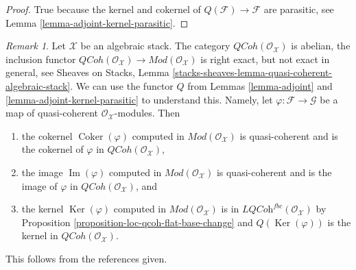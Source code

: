 \documentclass{stacks-project}
\theoremstyle{plain}
\theoremstyle{definition}
\theoremstyle{remark}
\newtheorem{remark}[subsection]{Remark}
\numberwithin{equation}{subsection}
\def\QCoh{\mathit{QCoh}}
\def\Ker{\mathop{\mathrm{Ker}}}
\def\Im{\mathop{\mathrm{Im}}}
\def\Coker{\mathop{\mathrm{Coker}}}
\begin{document}
\begin{proof}
True because the kernel and cokernel of $Q(\mathcal{F}) \to \mathcal{F}$
are parasitic, see Lemma \ref{lemma-adjoint-kernel-parasitic}.
\end{proof}

\begin{remark}
\label{remark-QCoh-abelian}
Let $\mathcal{X}$ be an algebraic stack. The category
$\QCoh(\mathcal{O}_\mathcal{X})$ is abelian, the inclusion functor
$\QCoh(\mathcal{O}_\mathcal{X}) \to \textit{Mod}(\mathcal{O}_\mathcal{X})$
is right exact, but not exact in general, see Sheaves on Stacks, Lemma
\ref{stacks-sheaves-lemma-quasi-coherent-algebraic-stack}.
We can use the functor $Q$ from
Lemmas \ref{lemma-adjoint} and \ref{lemma-adjoint-kernel-parasitic}
to understand this. Namely, let $\varphi : \mathcal{F} \to \mathcal{G}$
be a map of quasi-coherent $\mathcal{O}_\mathcal{X}$-modules. Then
\begin{enumerate}
\item the cokernel $\Coker(\varphi)$ computed in
$\textit{Mod}(\mathcal{O}_\mathcal{X})$ is quasi-coherent and
is the cokernel of $\varphi$ in $\QCoh(\mathcal{O}_\mathcal{X})$,
\item the image $\Im(\varphi)$ computed in
$\textit{Mod}(\mathcal{O}_\mathcal{X})$ is quasi-coherent and
is the image of $\varphi$ in $\QCoh(\mathcal{O}_\mathcal{X})$, and
\item the kernel $\Ker(\varphi)$ computed in
$\textit{Mod}(\mathcal{O}_\mathcal{X})$
is in $\textit{LQCoh}^{fbc}(\mathcal{O}_\mathcal{X})$
by Proposition \ref{proposition-loc-qcoh-flat-base-change} and
$Q(\Ker(\varphi))$ is the kernel in $\QCoh(\mathcal{O}_\mathcal{X})$.
\end{enumerate}
This follows from the references given.
\end{remark}
\end{document}
